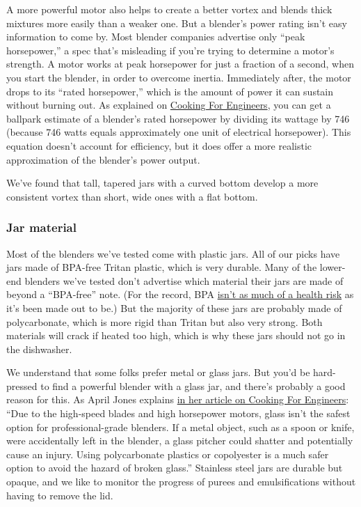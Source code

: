 A more powerful motor also helps to create a better vortex and blends
thick mixtures more easily than a weaker one. But a blender's power
rating isn't easy information to come by. Most blender companies
advertise only ``peak horsepower,'' a spec that's misleading if you're
trying to determine a motor's strength. A motor works at peak horsepower
for just a fraction of a second, when you start the blender, in order to
overcome inertia. Immediately after, the motor drops to its ``rated
horsepower,'' which is the amount of power it can sustain without
burning out. As explained on
\href{http://www.cookingforengineers.com/article/287/Understanding-Blender-Specifications/print}{Cooking
For Engineers}, you can get a ballpark estimate of a blender's rated
horsepower by dividing its wattage by 746 (because 746 watts equals
approximately one unit of electrical horsepower). This equation doesn't
account for efficiency, but it does offer a more realistic approximation
of the blender's power output.

We've found that tall, tapered jars with a curved bottom develop a more
consistent vortex than short, wide ones with a flat bottom.

\hypertarget{jar-material}{%
\subsubsection{Jar material}\label{jar-material}}

Most of the blenders we've tested come with plastic jars. All of our
picks have jars made of BPA-free Tritan plastic, which is very durable.
Many of the lower-end blenders we've tested don't advertise which
material their jars are made of beyond a ``BPA-free'' note. (For the
record, BPA
\href{https://www.nytimes3xbfgragh.onion/wirecutter/blog/bpa-panic-accomplished-nothing/}{isn't
as much of a health risk} as it's been made out to be.) But the majority
of these jars are probably made of polycarbonate, which is more rigid
than Tritan but also very strong. Both materials will crack if heated
too high, which is why these jars should not go in the dishwasher.

We understand that some folks prefer metal or glass jars. But you'd be
hard-pressed to find a powerful blender with a glass jar, and there's
probably a good reason for this. As April Jones explains
\href{http://www.cookingforengineers.com/article/287/Understanding-Blender-Specifications/print}{in
her article on Cooking For Engineers}: ``Due to the high-speed blades
and high horsepower motors, glass isn't the safest option for
professional-grade blenders. If a metal object, such as a spoon or
knife, were accidentally left in the blender, a glass pitcher could
shatter and potentially cause an injury. Using polycarbonate plastics or
copolyester is a much safer option to avoid the hazard of broken
glass.'' Stainless steel jars are durable but opaque, and we like to
monitor the progress of purees and emulsifications without having to
remove the lid.

